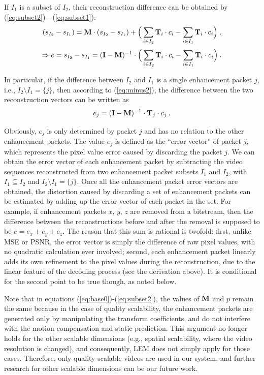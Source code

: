 \documentclass[journal,draftclsnofoot,onecolumn]{IEEEtran}
\begin{document}
If $I_1$ is a subset of $I_2$, their reconstruction difference can be obtained by (\ref{eq:subset2}) - (\ref{eq:subset1}):
\begin{equation}
\label{eq:minus1}
(s_{I_2} - s_{I_1}) = {\rm\bf M} \cdot (s_{I_2} - s_{I_1}) + \Big( \sum_{i \in I_2}{\rm\bf T}_i \cdot c_i - \sum_{i \in I_1}{\rm\bf T}_i \cdot c_i \Big) \: ,
\end{equation}
\begin{equation}
\label{eq:minus2}
\Rightarrow e = s_{I_2} - s_{I_1} = ({\rm\bf I - M})^{-1} \cdot \Big( \sum_{i \in I_2}{\rm\bf T}_i \cdot c_i - \sum_{i \in I_1}{\rm\bf T}_i \cdot c_i \Big) \: .
\end{equation}
	
In particular, if the difference between $I_2$ and $I_1$ is a single enhancement packet $j$, i.e., $I_2 \setminus I_1 = \{j\}$, then according to (\ref{eq:minus2}), the difference between the two reconstruction vectors can be written as
\begin{equation}
\label{eq:error_j}
e_j = ({\rm\bf I - M})^{-1} \cdot {\rm\bf T}_j \cdot c_j \: .
\end{equation}
	
Obviously, $e_j$ is only determined by packet $j$ and has no relation to the other enhancement packets. The value $e_j$ is defined as the ``error vector'' of packet $j$, which represents the pixel value error caused by discarding the packet $j$. We can obtain the error vector of each enhancement packet by subtracting the video sequences reconstructed from two enhancement packet subsets $I_1$ and $I_2$, with $I_1 \subseteq I_2$ and $I_2 \setminus I_1 =\{j\} $. Once all the enhancement packet error vectors are obtained, the distortion caused by discarding a set of enhancement packets can be estimated by adding up the error vector of each packet in the set. For example, if enhancement packets $x$, $y$, $z$ are removed from a bitstream, then the difference between the reconstructions before and after the removal is supposed to be $e = e_x + e_y + e_z$. The reason that this sum is rational is twofold: first, unlike MSE or PSNR, the error vector is simply the difference of raw pixel values, with no quadratic calculation ever involved; second, each enhancement packet linearly adds its own refinement to the pixel values during the reconstruction, due to the linear feature of the decoding process (see the derivation above). It is conditional for the second point to be true though, as noted below.

Note that in equations (\ref{eq:base0})-(\ref{eq:subset2}), the values of ${\rm\bf M}$ and $p$ remain the same because in the case of quality scalability, the enhancement packets are generated only by manipulating the transform coefficients, and do not interfere with the motion compensation and static prediction. This argument no longer holds for the other scalable dimensions (e.g., spatial scalability, where the video resolution is changed), and consequently, LEM does not simply apply for those cases. Therefore, only quality-scalable videos are used in our system, and further research for other scalable dimensions can be our future work.
\end{document}
